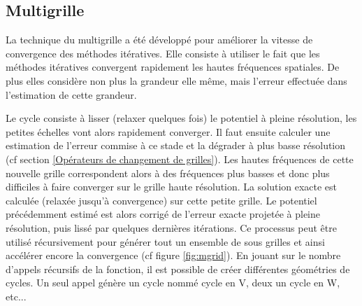 \subsection{Multigrille}

La technique du multigrille a été développé pour améliorer la vitesse de convergence des méthodes itératives.
Elle consiste à utiliser le fait que les méthodes itératives convergent rapidement les hautes fréquences spatiales.%
De plus elles considère non plus la grandeur elle même, mais l'erreur effectuée dans l'estimation de cette grandeur.

%
%

Le cycle consiste à lisser (relaxer quelques fois) le potentiel à pleine résolution, les petites échelles vont alors rapidement converger.
Il faut ensuite calculer une estimation de l'erreur commise à ce stade et la dégrader à plus basse résolution (cf section \ref{Opérateurs de changement de grilles}).
Les hautes fréquences de cette nouvelle grille correspondent alors à des fréquences plus basses et donc plus difficiles à faire converger sur le grille haute résolution. 
La solution exacte est calculée (relaxée jusqu'à convergence) sur cette petite grille.
Le potentiel précédemment estimé est alors corrigé de l'erreur exacte projetée à pleine résolution, puis lissé par quelques dernières itérations.
Ce processus peut être utilisé récursivement pour générer tout un ensemble de sous grilles et ainsi accélérer encore la convergence (cf figure \ref{fig:mgrid}).
En jouant sur le nombre d'appels récursifs de la fonction, il est possible de créer différentes géométries de cycles. 
Un seul appel génère un cycle nommé cycle en V, deux un cycle en W, etc... 


